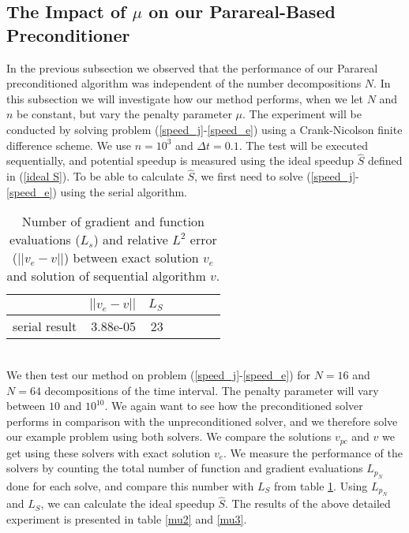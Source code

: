 \subsection{The Impact of $\mu$ on our Parareal-Based Preconditioner}
In the previous subsection we observed that the performance of our Parareal preconditioned algorithm was independent of the number decompositions $N$. In this subsection we will investigate how our method performs, when we let $N$ and $n$ be constant, but vary the penalty parameter $\mu$. The experiment will be conducted by solving problem (\ref{speed_j}-\ref{speed_e}) using a Crank-Nicolson finite difference scheme. We use $n=10^3$ and $\Delta t=0.1$. The test will be executed sequentially, and potential speedup is measured using the ideal speedup $\hat S$ defined in (\ref{ideal S}). To be able to calculate $\hat S$, we first need to solve (\ref{speed_j}-\ref{speed_e}) using the serial algorithm.
\\ 
\begin{table}[h]
\centering
\caption{Number of gradient and function evaluations ($L_s$) and relative $L^2$ error ($||v_e-v||$) between exact solution $v_e$ and solution of sequential algorithm $v$.} \label{mu1}
\begin{tabular}{lrrllrr}
\toprule
{}  &  $||v_e-v||$  &  $L_S$  \\
\midrule
serial result  &     3.88e-05 &   23    \\
\bottomrule
\end{tabular}
\end{table}
\\
We then test our method on problem (\ref{speed_j}-\ref{speed_e}) for $N=16$ and $N=64$ decompositions of the time interval. The penalty parameter will vary between $10$ and $10^{10}$. We again want to see how the preconditioned solver performs in comparison with the unpreconditioned solver, and we therefore solve our example problem using both solvers. We compare the solutions $v_{pc}$ and $v$ we get using these solvers with exact solution $v_e$. We measure the performance of the solvers by counting the total number of function and gradient evaluations $L_{p_N}$ done for each solve, and compare this number with $L_S$ from table \ref{mu1}. Using $L_{p_N}$ and $L_S$, we can calculate the ideal speedup $\hat S$. The results of the above detailed experiment is presented in table \ref{mu2} and \ref{mu3}.
\\
